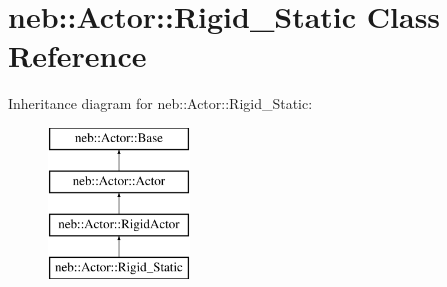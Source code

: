 \hypertarget{classneb_1_1Actor_1_1Rigid__Static}{\section{neb\-:\-:\-Actor\-:\-:\-Rigid\-\_\-\-Static \-Class \-Reference}
\label{classneb_1_1Actor_1_1Rigid__Static}
}
\-Inheritance diagram for neb\-:\-:\-Actor\-:\-:\-Rigid\-\_\-\-Static\-:\begin{figure}[H]
\begin{center}
\leavevmode
\includegraphics[height=4.000000cm]{classneb_1_1Actor_1_1Rigid__Static}
\end{center}
\end{figure}
